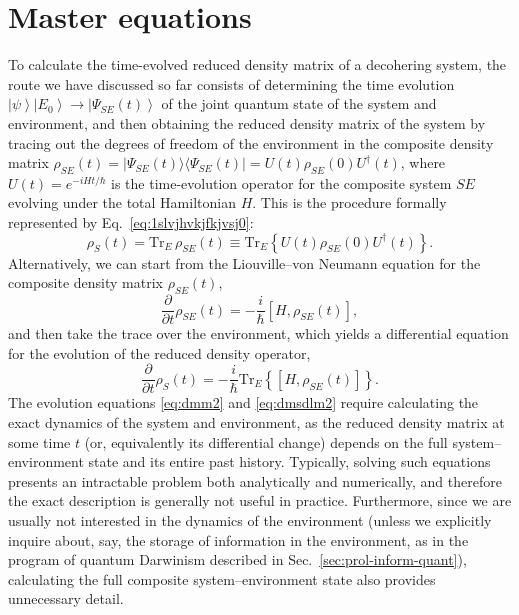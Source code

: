 \documentclass[3p,sort&compress]{elsarticle}
\newcommand{\ket}[1]{\left\vert{#1}\right\rangle}
\newcommand{\ketbra}[2]{\ensuremath{|{#1 \rangle}{\langle #2}|}}
\newcommand{\E}{\ensuremath{e}}
\newcommand{\I}{\ensuremath{i}}
\newcommand{\op}[1]{#1}
\begin{document}
\section{\label{sec:mastereqs}Master equations}

To calculate the time-evolved reduced density matrix of a decohering system, the route we have discussed so far consists of determining the time evolution $\ket{\psi}\ket{E_0} \longrightarrow \ket{\Psi_{SE}(t)}$ of the joint quantum state of the system and environment, and then obtaining the reduced density matrix of the system by tracing out the degrees of freedom of the environment in the composite density matrix $\op{\rho}_{SE}(t) = \ketbra{\Psi_{SE}(t)}{\Psi_{SE}(t)}=  U(t) \op{\rho}_{SE}(0) U^\dagger(t)$, where $U(t) = \E^{-\I \op{H} t/\hbar}$ is the time-evolution operator for the composite system $SE$ evolving under the total Hamiltonian $\op{H}$.  This is the procedure formally represented by Eq.~\eqref{eq:1slvjhvkjfkjvsj0}:
%
\begin{equation}
\label{eq:dmm2}
  \op{\rho}_S(t) = \text{Tr}_E \, \op{\rho}_{SE}(t) \equiv \text{Tr}_{E} \left\{ U(t) \op{\rho}_{SE}(0) U^\dagger(t) \right\}.
\end{equation}
%
Alternatively, we can start from the Liouville--von Neumann equation for the composite density matrix $\op{\rho}_{SE}(t)$,
\begin{equation}
\label{eq:dmm2xdfvb}
  \frac{\partial}{\partial t} \op{\rho}_{SE}(t) = -\frac{\I}{\hbar} \left[ \op{H}, \op{\rho}_{SE}(t)\right],
\end{equation}
%
and then take the trace over the environment, which yields a differential equation for the evolution of the reduced density operator,
%
\begin{equation}
\label{eq:dmsdlm2}
  \frac{\partial}{\partial t} \op{\rho}_S(t) = -\frac{\I}{\hbar} \text{Tr}_{E} \left\{ \left[ \op{H}, \op{\rho}_{SE}(t)\right]\right\}.
\end{equation}
%
The evolution equations \eqref{eq:dmm2} and \eqref{eq:dmsdlm2} require calculating the exact dynamics of the system and environment, as the reduced density matrix at some time $t$ (or, equivalently its differential change) depends on the full system--environment state and its entire past history. Typically, solving such equations presents an intractable problem both analytically and numerically, and therefore the exact description is generally not useful in practice. Furthermore, since we are usually not interested in the dynamics of the environment (unless we explicitly inquire about, say, the storage of information in the environment, as in the program of quantum Darwinism described in Sec.~\ref{sec:prol-inform-quant}), calculating the full composite system--environment state also provides unnecessary detail. 
\end{document}
